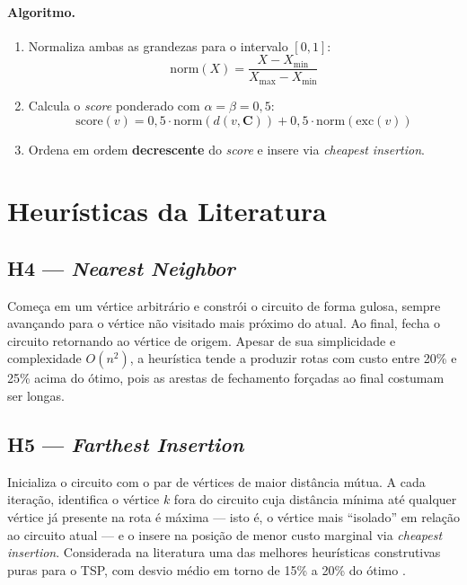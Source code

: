 \documentclass[12pt, a4paper]{article}
\begin{document}
\paragraph{Algoritmo.}
\begin{enumerate}
    \item Normaliza ambas as grandezas para o intervalo $[0, 1]$:
          \begin{equation}
              \mathrm{norm}(X) = \frac{X - X_{\min}}{X_{\max} - X_{\min}}
          \end{equation}
    \item Calcula o \textit{score} ponderado com $\alpha = \beta = 0{,}5$:
          \begin{equation}
              \mathrm{score}(v) =
              0{,}5 \cdot \mathrm{norm}\!\left(d(v, \mathbf{C})\right)
              + 0{,}5 \cdot \mathrm{norm}\!\left(\mathrm{exc}(v)\right)
          \end{equation}
    \item Ordena em ordem \textbf{decrescente} do \textit{score} e insere via
          \textit{cheapest insertion}.
\end{enumerate}

\section{Heurísticas da Literatura}

\subsection{H4 --- \textit{Nearest Neighbor} \cite{rosenkrantz1977}}

Começa em um vértice arbitrário e constrói o circuito de forma gulosa, sempre avançando
para o vértice não visitado mais próximo do atual. Ao final, fecha o circuito retornando
ao vértice de origem. Apesar de sua simplicidade e complexidade $O(n^2)$, a heurística
tende a produzir rotas com custo entre 20\% e 25\% acima do ótimo, pois as arestas de
fechamento forçadas ao final costumam ser longas.

\subsection{H5 --- \textit{Farthest Insertion} \cite{rosenkrantz1977}}

Inicializa o circuito com o par de vértices de maior distância mútua. A cada iteração,
identifica o vértice $k$ fora do circuito cuja distância mínima até qualquer vértice já
presente na rota é máxima --- isto é, o vértice mais ``isolado'' em relação ao circuito
atual --- e o insere na posição de menor custo marginal via \textit{cheapest insertion}.
Considerada na literatura uma das melhores heurísticas construtivas puras para o TSP,
com desvio médio em torno de 15\% a 20\% do ótimo \cite{rosenkrantz1977}.
\end{document}
